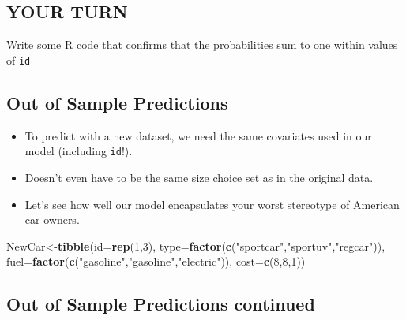 \documentclass[
  11pt,
]{article}
\newenvironment{Shaded}{\begin{snugshade}}{\end{snugshade}}
\newcommand{\AttributeTok}[1]{\textcolor[rgb]{0.13,0.29,0.53}{#1}}
\newcommand{\DecValTok}[1]{\textcolor[rgb]{0.00,0.00,0.81}{#1}}
\newcommand{\FunctionTok}[1]{\textcolor[rgb]{0.13,0.29,0.53}{\textbf{#1}}}
\newcommand{\NormalTok}[1]{#1}
\newcommand{\OtherTok}[1]{\textcolor[rgb]{0.56,0.35,0.01}{#1}}
\newcommand{\StringTok}[1]{\textcolor[rgb]{0.31,0.60,0.02}{#1}}
\providecommand{\tightlist}{%
  \setlength{\itemsep}{0pt}\setlength{\parskip}{0pt}}
\begin{document}
\normalsize

\hypertarget{your-turn-1}{%
\subsection{YOUR TURN}\label{your-turn-1}}

Write some R code that confirms that the probabilities sum to one within
values of \texttt{id}

\hypertarget{out-of-sample-predictions}{%
\subsection{Out of Sample Predictions}\label{out-of-sample-predictions}}

\begin{itemize}
\tightlist
\item
  To predict with a new dataset, we need the same covariates used in our
  model (including \texttt{id}!).
\item
  Doesn't even have to be the same size choice set as in the original
  data.
\item
  Let's see how well our model encapsulates your worst stereotype of
  American car owners.
\end{itemize}

\footnotesize

\begin{Shaded}
\begin{Highlighting}[]
\NormalTok{NewCar}\OtherTok{\textless{}{-}}\FunctionTok{tibble}\NormalTok{(}\AttributeTok{id=}\FunctionTok{rep}\NormalTok{(}\DecValTok{1}\NormalTok{,}\DecValTok{3}\NormalTok{),}
               \AttributeTok{type=}\FunctionTok{factor}\NormalTok{(}\FunctionTok{c}\NormalTok{(}\StringTok{"sportcar"}\NormalTok{,}\StringTok{"sportuv"}\NormalTok{,}\StringTok{"regcar"}\NormalTok{)),}
               \AttributeTok{fuel=}\FunctionTok{factor}\NormalTok{(}\FunctionTok{c}\NormalTok{(}\StringTok{"gasoline"}\NormalTok{,}\StringTok{"gasoline"}\NormalTok{,}\StringTok{"electric"}\NormalTok{)),}
               \AttributeTok{cost=}\FunctionTok{c}\NormalTok{(}\DecValTok{8}\NormalTok{,}\DecValTok{8}\NormalTok{,}\DecValTok{1}\NormalTok{))}
\end{Highlighting}
\end{Shaded}

\normalsize

\hypertarget{out-of-sample-predictions-continued}{%
\subsection{Out of Sample Predictions
continued}\label{out-of-sample-predictions-continued}}
\end{document}
